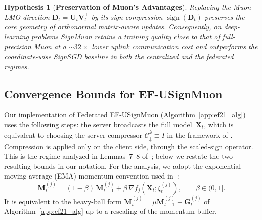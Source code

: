 \documentclass{article}
\newtheorem{hypothesis}{Hypothesis}
\begin{document}
\begin{hypothesis}[\textbf{Preservation of Muon's Advantages}]\label{hyp:2}
Replacing the Muon LMO direction $\mathbf{D}_t = \mathbf{U}_t \mathbf{V}_t^\top$ by its sign compression $\operatorname{sign}(\mathbf{D}_t)$ preserves the core geometry of orthonormal matrix-aware updates. Consequently, on deep-learning problems SignMuon retains a training quality close to that of full-precision Muon at a $\sim32\times$ lower uplink communication cost and outperforms the coordinate-wise SignSGD baseline in both the centralized and the federated regimes. 
\end{hypothesis}

\newpage
\subsection{Convergence Bounds for EF-USignMuon}\label{app:ef_bounds}

Our implementation of Federated EF-USignMuon (Algorithm~\ref{app:ef21_alg}) uses the following steps: the server broadcasts the full model~$\mathbf{X}_t$, which is equivalent to choosing the server compressor $\mathcal{C}_{\downarrow}^k \equiv I$ in the framework of \cite{gruntkowska2025error}. Compression is applied only on the client side, through the scaled-sign operator. This is the regime analyzed in Lemmas~7--8 of~\cite{gruntkowska2025error}; below we restate the two resulting bounds in our notation. For the analysis, we adopt the exponential moving-average (EMA) momentum convention used in~\cite{gruntkowska2025error}:
\[
\mathbf{M}_t^{(j)} = (1-\beta)\,\mathbf{M}_{t-1}^{(j)} + \beta\,\nabla f_j(\mathbf{X}_t;\xi_t^{(j)}), \qquad \beta\in(0,1].
\]
It is equivalent to the heavy-ball form $\mathbf{M}_t^{(j)}=\mu\mathbf{M}_{t-1}^{(j)}+\mathbf{G}_t^{(j)}$ of Algorithm~\ref{app:ef21_alg} up to a rescaling of the momentum buffer.
\end{document}
